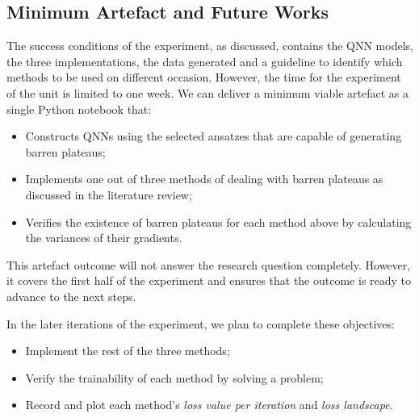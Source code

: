 \subsection{Minimum Artefact and Future Works}
\label{Minimum Artefacts}

The success conditions of the experiment, as discussed, contains the QNN models, the three implementations, the data generated and a guideline to identify which methods to be used on different occasion.
However, the time for the experiment of the unit is limited to one week. We can deliver a minimum viable artefact as a single Python notebook that:
\begin{itemize}
    \item Constructs QNNs using the selected ansatzes that are capable of generating barren plateaus;
    \item {}Implements one out of three methods of dealing with barren plateaus as discussed in the literature review;
    \item Verifies the existence of barren plateaus for each method above by calculating the variances of their gradients.
\end{itemize}

This artefact outcome will not answer the research question completely.
However, it covers the first half of the experiment and ensures that the outcome is ready to advance to the next steps.

In the later iterations of the experiment, we plan to complete these objectives:
\begin{itemize}
    \item Implement the rest of the three methods;
    \item Verify the trainability of each method by solving a problem;
    \item Record and plot each method's \textit{loss value per iteration} and \textit{loss landscape}.
\end{itemize}

